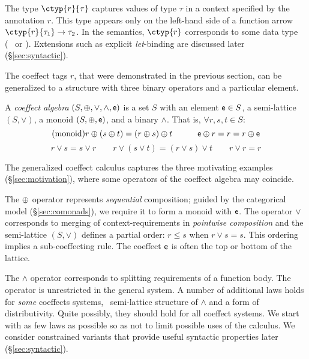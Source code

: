 The type $\ctyp{r}{\tau}$ captures values of type $\tau$ in a context
specified by the annotation  $r$. This type appears only on the
left-hand side of a function arrow $\ctyp{r}{\tau_1} \rightarrow \tau_2$. 
In the semantics, $\ctyp{r}$ corresponds to some data type
(\eg{}~ or ). Extensions
such as explicit \emph{let}-binding are discussed later
(\S\ref{sec:syntactic}).

The coeffect tags $r$, that were demonstrated in the previous section, can be generalized to a 
structure with three binary operators and a particular element. 

\begin{definition}
A \emph{coeffect algebra} $(S, \oplus, \vee, \wedge, \mathsf{e})$ is a set $S$ with
an element $\mathsf{e} \in S$, a semi-lattice $(S, \vee)$, a monoid $(S, \oplus, \mathsf{e})$,
and a binary $\wedge$. That is, $\forall r,s,t\in S$:
\begin{equation}
\tag{monoid}
   r \oplus (s \oplus t) = (r \oplus s) \oplus t 
\quad\quad\quad
   \mathsf{e} \oplus r = r = r \oplus \mathsf{e}  \quad\quad
\end{equation}
\vspace{-1.5em}
\begin{equation}
\tag{semi-lattice}
   r \vee s = s \vee r 
\quad\quad
   r \vee (s \vee t) = (r \vee s) \vee t
\quad\quad
   r \vee r = r
\end{equation}
\end{definition}
%
The generalized coeffect calculus captures the three motivating examples (\S\ref{sec:motivation}),
where some operators of the coeffect algebra may coincide. 

The $\oplus$ operator represents \emph{sequential} composition; guided by the categorical
model (\S\ref{sec:comonads}), we require it to form a monoid with $\mathsf{e}$.
The operator $\vee$ corresponds to merging of context-requirements in \emph{pointwise composition} 
and the semi-lattice $(S, \vee)$ defines a partial order: $r \leq s$ when 
$r \vee s = s$. This ordering implies a sub-coeffecting rule.  
The coeffect $\mathsf{e}$ is often the top or bottom of the lattice.

The $\wedge$ operator corresponds to splitting requirements of a function body. 
The operator is unrestricted in the general system.
A number of additional laws holds for \emph{some} coeffects systems, \eg{}~semi-lattice structure of
$\wedge$ and a form of distributivity. Quite possibly, they should hold for all coeffect systems.  
We start with as few laws as possible so as not to limit possible uses of the calculus.  
We consider constrained variants that provide useful syntactic properties later (\S\ref{sec:syntactic}).


